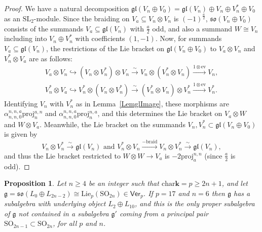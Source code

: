 \documentclass[11pt,a4paper,reqno]{amsart}
\newtheorem{prop}[theorem]{Proposition}
\theoremstyle{definition}
\newcommand{\bk}{\mathbf{k}}
\numberwithin{equation}{section}
\newcommand{\ev}{\mathrm{ev}}
\newcommand{\braid}{\mathrm{braid}}
\newcommand{\charr}{\mathrm{char}}
\newcommand{\Ver}{\mathsf{Ver}}
\newcommand{\fg}{\mathfrak{g}}
\newcommand{\fgl}{\mathfrak{gl}}
\newcommand{\fso}{\mathfrak{so}}
\newcommand{\Lie}{\mathrm{Lie}}
\newcommand{\SL}{\mathrm{SL}}
\newcommand{\SO}{\mathrm{SO}}
\newcommand{\proj}{\mathrm{proj}}
\begin{document}
\begin{proof}
We have a natural decomposition $\fgl(V_n\oplus V_0)=\fgl(V_n)\oplus V_n\oplus V_n^*\oplus V_0$ as an $\SL_2$-module. Since the braiding on $V_a\subseteq V_n\otimes V_n$ is $(-1)^{\frac a2}$, $\fso(V_n\oplus V_0)$ consists of the summands $V_a\subseteq\fgl(V_n)$ with $\frac a2$ odd, and also a summand $W\cong V_n$ including into $V_n\oplus V_n^*$ with coefficients $(1,-1)$. Now, for summands $V_a\subseteq\fgl(V_n)$, the restrictions of the Lie bracket on $\fgl(V_n\oplus V_0)$ to $V_a\otimes V_n$ and $V_n^*\otimes V_a$ are as follows:
\begin{align*}
V_a\otimes V_n\hookrightarrow(V_n\otimes V_n^*)\otimes V_n \xrightarrow{\sim} V_n\otimes(V_n^*\otimes V_n) \xrightarrow{1\otimes\ev} V_n,\\
V_n^*\otimes V_a\hookrightarrow V_n^*\otimes (V_n\otimes V_n^*) \xrightarrow{\sim} (V_n^*\otimes V_n)\otimes V_n^* \xrightarrow{1\otimes\ev} V_n^*.
\end{align*}
Identifying $V_n$ with $V_n^*$ as in Lemma~\ref{LemglImage}, these morphisms are $\alpha^{n,n,a}_{n,n,0}\proj^{a,n}_n$ and $\alpha^{n,n,a}_{n,n,0}\proj^{n,a}_n$, and this determines the Lie bracket on $V_a\otimes W$ and $W\otimes V_a$. Meanwhile, the Lie bracket on the summands $V_n,V_n^*\subset\fgl(V_n\oplus V_0)$ is given by
\[V_n\otimes V_n^*\xrightarrow{\sim}\fgl(V_n)\text{ and } V_n^*\otimes V_n\xrightarrow{-\braid}V_n\otimes V_n^*\xrightarrow{\sim}\fgl(V_n),\]
and thus the Lie bracket restricted to $W\otimes W\to V_a$ is $-2\proj^{n,n}_a$ (since $\frac a2$ is odd).
\end{proof}

\begin{prop}\label{PropTypeD}
Let $n\geq4$ be an integer such that $\charr\bk=p\geq2n+1$, and let $\fg=\fso(L_0\oplus L_{2n-2})\cong\Lie_p(\SO_{2n})\in\Ver_p$. If $p=17$ and $n=6$ then $\fg$ has a subalgebra with underlying object $L_2\oplus L_{10}$, and this is the only proper subalgebra of $\fg$ not contained in a subalgebra $\fg'$ coming from a principal pair $\SO_{2n-1}\subset\SO_{2n}$, for all $p$ and $n$.
\end{prop}
\end{document}
